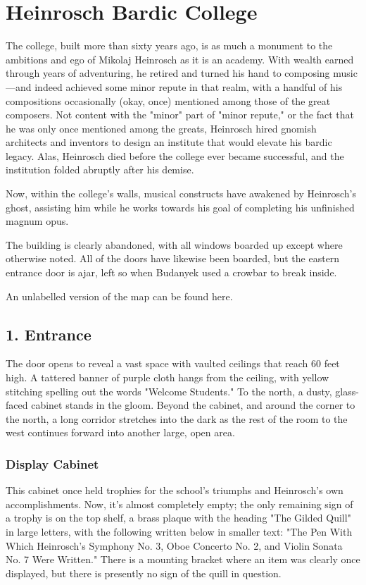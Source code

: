 \documentclass[10pt,a4paper,twoside,bg=print,twocolumn,openany,nodeprecatedcode]{dndbook}
\begin{document}
\section{Heinrosch Bardic College}
The college, built more than sixty years ago, is as much a monument to the ambitions and ego of Mikolaj Heinrosch as it is an academy. With wealth earned through years of adventuring, he retired and turned his hand to composing music—and indeed achieved some minor repute in that realm, with a handful of his compositions occasionally (okay, once) mentioned among those of the great composers. Not content with the "minor" part of "minor repute," or the fact that he was only once mentioned among the greats, Heinrosch hired gnomish architects and inventors to design an institute that would elevate his bardic legacy. Alas, Heinrosch died before the college ever became successful, and the institution folded abruptly after his demise.

Now, within the college's walls, musical constructs have awakened by Heinrosch's ghost, assisting him while he works towards his goal of completing his unfinished magnum opus.

The building is clearly abandoned, with all windows boarded up except where otherwise noted. All of the doors have likewise been boarded, but the eastern entrance door is ajar, left so when Budanyek used a crowbar to break inside.

An unlabelled version of the map can be found here.

\subsection{1. Entrance}
\begin{DndReadAloud}{}
The door opens to reveal a vast space with vaulted ceilings that reach 60 feet high. A tattered banner of purple cloth hangs from the ceiling, with yellow stitching spelling out the words "Welcome Students." To the north, a dusty, glass-faced cabinet stands in the gloom. Beyond the cabinet, and around the corner to the north, a long corridor stretches into the dark as the rest of the room to the west continues forward into another large, open area.

\end{DndReadAloud}

\subsubsection{Display Cabinet}
This cabinet once held trophies for the school's triumphs and Heinrosch's own accomplishments. Now, it's almost completely empty; the only remaining sign of a trophy is on the top shelf, a brass plaque with the heading "The Gilded Quill" in large letters, with the following written below in smaller text: "The Pen With Which Heinrosch's Symphony No. 3, Oboe Concerto No. 2, and Violin Sonata No. 7 Were Written." There is a mounting bracket where an item was clearly once displayed, but there is presently no sign of the quill in question.
\end{document}
